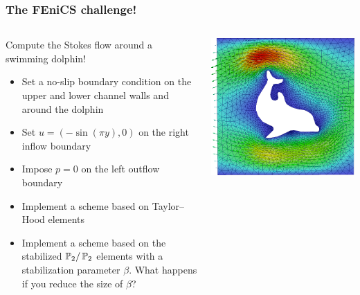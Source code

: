\begin{frame}[shrink=10]
    \frametitle{The FEniCS challenge!}
    \vspace{1em}
    \begin{columns}[c]
        \begin{column}{0.5\textwidth}
            Compute the Stokes flow around a swimming dolphin!
            \begin{itemize}
                \item Set a no-slip boundary condition on the upper and
                    lower channel walls and around the dolphin
                \item Set $u = (-\sin(\pi y),0)$ on the right inflow
                    boundary
                \item Impose $p=0$ on the left outflow boundary
                \item Implement a scheme based on Taylor--Hood elements
                \item Implement a scheme based on the stabilized
                $\mathbb{P}_2/\,\mathbb{P}_2$ elements with a stabilization parameter
                    $\beta$.  What happens if you reduce the size of
                    $\beta$?
            \end{itemize}
        \end{column}
        \begin{column}{0.5\textwidth}
            \includegraphics[width=1.0\textwidth]{png/stokes_dolphin_channel_u_alpha.png}
        \end{column}
    \end{columns}
    \begin{center}
    \end{center}
\end{frame}
